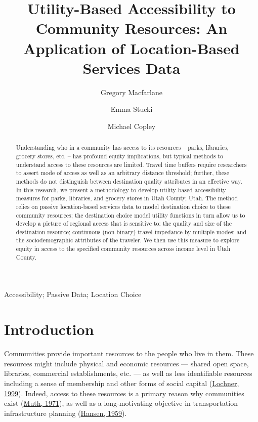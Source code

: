 \documentclass[3p, authoryear, review]{elsarticle} %
\begin{document}
\begin{frontmatter}

  \title{Utility-Based Accessibility to Community Resources: An Application of Location-Based Services Data}
    \author[BYU]{Gregory Macfarlane}
    \author[BYU]{Emma Stucki}
    \author[BYU]{Michael Copley}
  
    \author[]{}
  
  
  \begin{abstract}
  Understanding who in a community has access to its resources -- parks, libraries,
  grocery stores, etc. -- has profound equity implications, but typical methods
  to understand access to these resources are limited. Travel time buffers require
  researchers to assert mode of access as well as an arbitrary distance threshold;
  further, these methods do not distinguish between destination quality attributes
  in an effective way. In this research, we present a methodology to develop
  utility-based accessibility measures for parks, libraries, and grocery stores
  in Utah County, Utah. The method relies on passive location-based services data
  to model destination choice to these community resources; the destination choice
  model utility functions in turn allow us to develop a picture of regional access
  that is sensitive to: the quality and size of the destination resource;
  continuous (non-binary) travel impedance by multiple modes; and the
  sociodemographic attributes of the traveler. We then use this measure
  to explore equity in access to the specified community resources across
  income level in Utah County.
  \end{abstract}
   \begin{keyword} Accessibility; Passive Data; Location Choice\end{keyword}
 \end{frontmatter}

\hypertarget{intro}{%
\section{Introduction}\label{intro}}

Communities provide important resources to the people who live in them. These
resources might include physical and economic resources
--- shared open space, libraries, commercial establishments, etc. --- as well as less identifiable resources
including a sense of membership and other forms of social capital
(\protect\hyperlink{ref-lochner1999}{Lochner, 1999}). Indeed, access to these resources is a primary reason why
communities exist (\protect\hyperlink{ref-muth1971}{Muth, 1971}), as well as a long-motivating objective in
transportation infrastructure planning (\protect\hyperlink{ref-hansen1959}{Hansen, 1959}).
\end{document}
